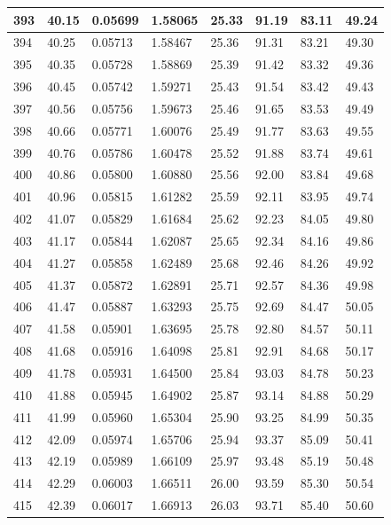\documentclass[12pt,a4paper,twoside]{article}
\begin{document}
\begin{center}
\begin{longtable}{l l l l | l l l l}
393 & 40.15 & 0.05699 & 1.58065 & 25.33 & 91.19 & 83.11 & 49.24 \\ \hline
394 & 40.25 & 0.05713 & 1.58467 & 25.36 & 91.31 & 83.21 & 49.30 \\ \hline
395 & 40.35 & 0.05728 & 1.58869 & 25.39 & 91.42 & 83.32 & 49.36 \\ \hline
396 & 40.45 & 0.05742 & 1.59271 & 25.43 & 91.54 & 83.42 & 49.43 \\ \hline
397 & 40.56 & 0.05756 & 1.59673 & 25.46 & 91.65 & 83.53 & 49.49 \\ \hline
398 & 40.66 & 0.05771 & 1.60076 & 25.49 & 91.77 & 83.63 & 49.55 \\ \hline
399 & 40.76 & 0.05786 & 1.60478 & 25.52 & 91.88 & 83.74 & 49.61 \\ \hline
400 & 40.86 & 0.05800 & 1.60880 & 25.56 & 92.00 & 83.84 & 49.68 \\ \hline
401 & 40.96 & 0.05815 & 1.61282 & 25.59 & 92.11 & 83.95 & 49.74 \\ \hline
402 & 41.07 & 0.05829 & 1.61684 & 25.62 & 92.23 & 84.05 & 49.80 \\ \hline
403 & 41.17 & 0.05844 & 1.62087 & 25.65 & 92.34 & 84.16 & 49.86 \\ \hline
404 & 41.27 & 0.05858 & 1.62489 & 25.68 & 92.46 & 84.26 & 49.92 \\ \hline
405 & 41.37 & 0.05872 & 1.62891 & 25.71 & 92.57 & 84.36 & 49.98 \\ \hline
406 & 41.47 & 0.05887 & 1.63293 & 25.75 & 92.69 & 84.47 & 50.05 \\ \hline
407 & 41.58 & 0.05901 & 1.63695 & 25.78 & 92.80 & 84.57 & 50.11 \\ \hline
408 & 41.68 & 0.05916 & 1.64098 & 25.81 & 92.91 & 84.68 & 50.17 \\ \hline
409 & 41.78 & 0.05931 & 1.64500 & 25.84 & 93.03 & 84.78 & 50.23 \\ \hline
410 & 41.88 & 0.05945 & 1.64902 & 25.87 & 93.14 & 84.88 & 50.29 \\ \hline
411 & 41.99 & 0.05960 & 1.65304 & 25.90 & 93.25 & 84.99 & 50.35 \\ \hline
412 & 42.09 & 0.05974 & 1.65706 & 25.94 & 93.37 & 85.09 & 50.41 \\ \hline
413 & 42.19 & 0.05989 & 1.66109 & 25.97 & 93.48 & 85.19 & 50.48 \\ \hline
414 & 42.29 & 0.06003 & 1.66511 & 26.00 & 93.59 & 85.30 & 50.54 \\ \hline
415 & 42.39 & 0.06017 & 1.66913 & 26.03 & 93.71 & 85.40 & 50.60 \\ \hline

\end{longtable}
\end{center}
\end{document}
